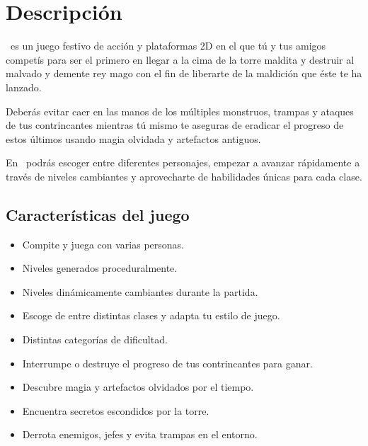 \justifying
\thispagestyle{fancy}
\fancyhf{}
\renewcommand{\headrulewidth}{0.5pt}
\fancyhead[R]{\small\slshape\thepage}
\frenchspacing
{}

\setlength{\parindent}{0cm} %
\setlength{\parskip}{1.5ex plus 0.5ex minus 0.5ex}   %

\setlength\headheight{15pt}
\section{Descripción}

\emph{\izenburua}\ es un juego festivo de acción y plataformas 2D en el que tú y
tus amigos competís para ser el primero en llegar a la cima de la torre maldita
y destruir al malvado y demente rey mago con el fin de liberarte de la maldición
que éste te ha lanzado.

Deberás evitar caer en las manos de los múltiples monstruos, trampas y ataques
de tus contrincantes mientras tú mismo te aseguras de eradicar el progreso de
estos últimos usando magia olvidada y artefactos antiguos.

En \emph{\izenburua}\ podrás escoger entre diferentes personajes, empezar a
avanzar rápidamente a través de niveles cambiantes y aprovecharte de habilidades
únicas para cada clase.

\subsection{Características del juego}

\begin{itemize}
    \item Compite y juega con varias personas.
    \item Niveles generados proceduralmente.
    \item Niveles dinámicamente cambiantes durante la partida.
    \item Escoge de entre distintas clases y adapta tu estilo de juego.
    \item Distintas categorías de dificultad.
    \item Interrumpe o destruye el progreso de tus contrincantes para ganar.
    \item Descubre magia y artefactos olvidados por el tiempo.
    \item Encuentra secretos escondidos por la torre.
    \item Derrota enemigos, jefes y evita trampas en el entorno.
\end{itemize}

